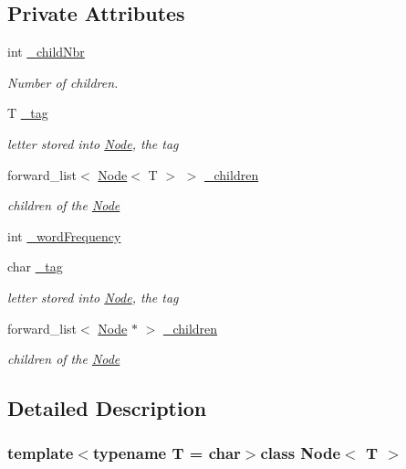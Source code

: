 \subsection*{Private Attributes}
\begin{DoxyCompactItemize}
\item 
int \hyperlink{class_node_a4b3606724f7302e3df96ff87d623312d}{\-\_\-child\-Nbr}
\begin{DoxyCompactList}\small\item\em Number of children. \end{DoxyCompactList}\item 
T \hyperlink{class_node_a82089b860871012bc159c510408be29c}{\-\_\-tag}
\begin{DoxyCompactList}\small\item\em letter stored into \hyperlink{class_node}{Node}, the tag \end{DoxyCompactList}\item 
forward\-\_\-list$<$ \hyperlink{class_node}{Node}$<$ T $>$ $>$ \hyperlink{class_node_a845317829093b3d4665ba7e0055b4599}{\-\_\-children}
\begin{DoxyCompactList}\small\item\em children of the \hyperlink{class_node}{Node} \end{DoxyCompactList}\item 
int \hyperlink{class_node_add728cb28da68ec5ef2d9cac31c9a08d}{\-\_\-word\-Frequency}
\item 
char \hyperlink{class_node_a24a667af4a37caad6e15b94fb76885b1}{\-\_\-tag}
\begin{DoxyCompactList}\small\item\em letter stored into \hyperlink{class_node}{Node}, the tag \end{DoxyCompactList}\item 
forward\-\_\-list$<$ \hyperlink{class_node}{Node} $\ast$ $>$ \hyperlink{class_node_ac4c86c8bbc999016827248dbe8b7cc96}{\-\_\-children}
\begin{DoxyCompactList}\small\item\em children of the \hyperlink{class_node}{Node} \end{DoxyCompactList}\end{DoxyCompactItemize}


\subsection{Detailed Description}
\subsubsection*{template$<$typename T = char$>$class Node$<$ T $>$}

